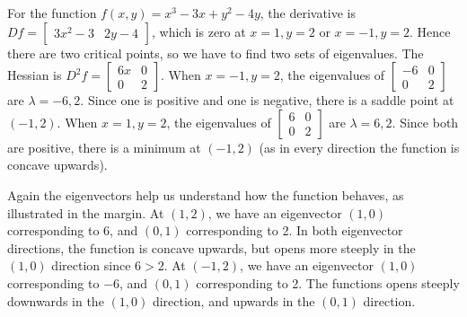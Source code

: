 \begin{example}
For the function {$f(x,y)=x^3-3x+y^2-4y$}, the derivative is $Df = \begin{bmatrix}3x^2-3&2y-4 \end{bmatrix}$, which is zero at $x=1,y=2$ or $x=-1,y=2$. Hence there are two critical points, so we have to find two sets of eigenvalues. The Hessian is $D^2f = \begin{bmatrix}6x&0 \\0&2\end{bmatrix}$. When $x=-1,y=2$, the eigenvalues of $\begin{bmatrix}-6&0 \\0&2\end{bmatrix}$ are $\lambda=-6,2$. Since one is positive and one is negative, there is a saddle point at $(-1,2)$. When $x=1,y=2$, the eigenvalues of $\begin{bmatrix}6&0 \\0&2\end{bmatrix}$ are $\lambda=6,2$. Since both are positive, there is a minimum at $(-1,2)$ (as in every direction the function is concave upwards).

Again the eigenvectors help us understand how the function behaves, as illustrated in the margin.  At $(1,2)$, we have an eigenvector $(1,0)$ corresponding to 6, and $(0,1)$ corresponding to 2. In both eigenvector directions, the function is concave upwards, but opens more steeply in the $(1,0)$ direction since \mbox{$6>2$}.  At $(-1,2)$, we have an eigenvector $(1,0)$ corresponding to $-6$, and $(0,1)$ corresponding to 2. The functions opens steeply downwards in the $(1,0)$ direction, and upwards in the $(0,1)$ direction.
\end{example}

